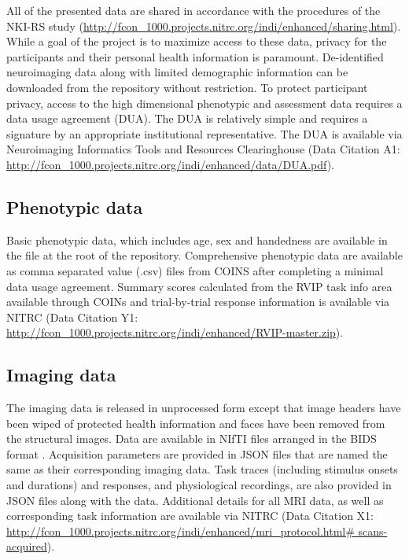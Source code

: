 All of the presented data are shared in accordance with the procedures of the NKI-RS study (\url{http://fcon\_1000.projects.nitrc.org/indi/enhanced/sharing.html}). While a goal of the project is to maximize access to these data, privacy for the participants and their personal health information is paramount. De-identified neuroimaging data along with limited demographic information can be downloaded from the repository without restriction. To protect participant privacy, access to the high dimensional phenotypic and assessment data requires a data usage agreement (DUA). The DUA is relatively simple and requires a signature by an appropriate institutional representative. The DUA is available via Neuroimaging Informatics Tools and Resources Clearinghouse (Data Citation A1: \url{http://fcon\_1000.projects.nitrc.org/indi/enhanced/data/DUA.pdf}).

\subsection{Phenotypic data}
Basic phenotypic data, which includes age, sex and handedness are available in the  file at the root of the repository. Comprehensive phenotypic data are available as comma separated value (.csv) files from COINS after completing a minimal data usage agreement. Summary scores calculated from the RVIP task info area available through COINs and trial-by-trial response information is available via NITRC (Data Citation Y1: \url{http://fcon\_1000.projects.nitrc.org/indi/enhanced/RVIP-master.zip}).

\subsection{Imaging data}
The imaging data is released in unprocessed form except that image headers have been wiped of protected health information and faces have been removed from the structural images. Data are available in NIfTI files arranged in the BIDS format \cite{Gorgolewski2016}. Acquisition parameters are provided in JSON files that are named the same as their corresponding imaging data. Task traces (including stimulus onsets and durations) and responses, and physiological recordings, are also provided in JSON files along with the data. Additional details for all MRI data, as well as corresponding task information are available via NITRC (Data Citation X1: \url{http://fcon\_1000.projects.nitrc.org/indi/enhanced/mri\_protocol.html\# scans-acquired}).

